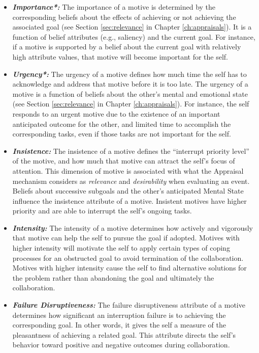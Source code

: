 \documentclass[12pt]{report}
\begin{document}
\begin{itemize}
  \item \textbf{\textit{Importance*:}} The importance of a motive is determined
  by the corresponding beliefs about the effects of achieving or not achieving
  the associated goal (see Section \ref{sec:relevance} in Chapter
  \ref{ch:appraisals}). It is a function of belief attributes (e.g., saliency)
  and the current goal. For instance, if a motive is supported by a belief about
  the current goal with relatively high attribute values, that motive will
  become important for the self.
  
  \item \textbf{\textit{Urgency*:}} The urgency of a motive defines how much
  time the self has to acknowledge and address that motive before it is too
  late. The urgency of a motive is a function of beliefs about the other's
  mental and emotional state (see Section \ref{sec:relevance} in Chapter
  \ref{ch:appraisals}). For instance, the self responds to an urgent motive due
  to the existence of an important anticipated outcome for the other, and
  limited time to accomplish the corresponding tasks, even if those tasks are
  not important for the self.
  
  \item \textbf{\textit{Insistence:}} The insistence of a motive defines the
  ``interrupt priority level'' of the motive, and how much that motive can
  attract the self's focus of attention. This dimension of motive is associated
  with what the Appraisal mechanism considers as \emph{relevance} and
  \emph{desirability} when evaluating an event. Beliefs about successive
  subgoals and the other's anticipated Mental State influence the insistence
  attribute of a motive. Insistent motives have higher priority and are able to
  interrupt the self's ongoing tasks.
  
  \item \textbf{\textit{Intensity:}} The intensity of a motive determines how
  actively and vigorously that motive can help the self to pursue the goal if
  adopted. Motives with higher intensity will motivate the self to apply
  certain types of coping processes for an obstructed goal to avoid termination
  of the collaboration. Motives with higher intensity cause the self to find
  alternative solutions for the problem rather than abandoning the goal and
  ultimately the collaboration.
  
  \item \textbf{\textit{Failure Disruptiveness:}} The failure disruptiveness
  attribute of a motive determines how significant an interruption failure is to
  achieving the corresponding goal. In other words, it gives the self a measure
  of the pleasantness of achieving a related goal. This attribute directs the
  self's behavior toward positive and negative outcomes during collaboration.
\end{itemize}
\end{document}

